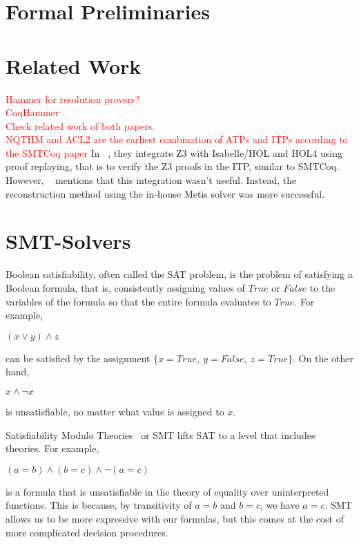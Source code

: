 \documentclass{article}
\begin{document}
\section{Formal Preliminaries}
\label{sec:prelim}

\section{Related Work}
\label{sec:rel}
	\textcolor{red}{Hammer for resolution provers?}\\
	\textcolor{red}{CoqHammer}\\
	\textcolor{red}{Check related work of both papers.}\\
	\textcolor{red}{NQTHM and ACL2 are the earliest combination of ATPs and ITPs according to the SMTCoq paper}
	In ~\cite{10.1007/978-3-642-14052-5_14}, they integrate 
	Z3 with Isabelle/HOL and HOL4 
	using proof replaying, that is to verify 
	the Z3 proofs in the ITP, similar to SMTCoq. However, 
	~\cite{10.1007/978-3-642-22438-6_11} mentions that this
	integration wasn't useful. Instead, the reconstruction 
	method using the in-house Metis solver was more 
	successful. 
	
\section{SMT-Solvers}
\label{sec:smt}
	Boolean satisfiability, often called the SAT problem, 
	is the problem of satisfying a Boolean formula, that is, 
	consistently assigning values of $True$ or $False$ 
	to the variables of the formula so that the entire 
	formula evaluates to $True$. For example,
	\begin{center}$(x \lor y) \land z$ \end{center}
	can be satisfied by the 
	assignment $\{x=True,\ y=False,\ z=True\}$. On the other hand, 
	\begin{center} $x \land \neg x$ \end{center}
	is unsatisfiable, no matter what value is assigned to $x$.
	
	Satisfiability Modulo Theories~\cite{DBLP:reference/mc/BarrettT18} 
	or SMT lifts SAT to a level that includes theories. 
	For example, 
	\begin{center} $(a = b) \land (b = c) \land \neg (a = c)$ 
	\end{center}
	is a formula that is unsatisfiable in the theory of 
	equality over uninterpreted functions. This is because, by
	transitivity of $a = b$ and $b = c$, we have $a = c$. SMT 
	allows us to be more expressive with our formulas, but 
	this comes at the cost of more complicated decision 
	procedures.
	
\end{document}
